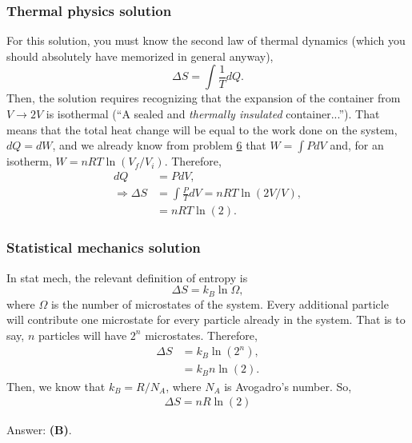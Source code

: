 \documentclass[11pt]{paper}
\newcommand{\answer}[1]{Answer: \textbf{(#1)}.}
\begin{document}
\subsubsection*{Thermal physics solution}
For this solution, you must know the second law of thermal dynamics (which you should absolutely have memorized in general anyway),
\begin{equation}
\Delta S = \int \frac{1}{T}dQ.
\end{equation}
Then, the solution requires recognizing that the expansion of the container from $V\rightarrow2V$ is isothermal (``A sealed and \emph{thermally insulated} container...'').  That means that the total heat change will be equal to the work done on the system, $dQ = dW$, and we already know from problem \hyperlink{section.6}{6} that $W = \int PdV$ and, for an isotherm, $W = nRT\ln(V_f/V_i)$.  Therefore,
\begin{align}
dQ &= PdV,\\
\Rightarrow \Delta S &= \int \frac{P}{T}dV = nRT\ln(2V/V),\\
&= nRT\ln(2). 
\end{align}
\subsubsection*{Statistical mechanics solution}
In stat mech, the relevant definition of entropy is
\begin{equation}
\Delta S = k_B \ln\Omega,
\end{equation}
where $\Omega$ is the number of microstates of the system.  Every additional particle will contribute one microstate for every particle already in the system.  That is to say, $n$ particles will have $2^n$ microstates.  Therefore,
\begin{align}
\Delta S &= k_B \ln\left(2^n\right),\\
&= k_B n\ln(2).
\end{align}
Then, we know that $k_B = R/N_A$, where $N_A$ is Avogadro's number.  So,
\begin{align}
\Delta S = nR\ln(2)
\end{align}

\answer{B}
\end{document}
